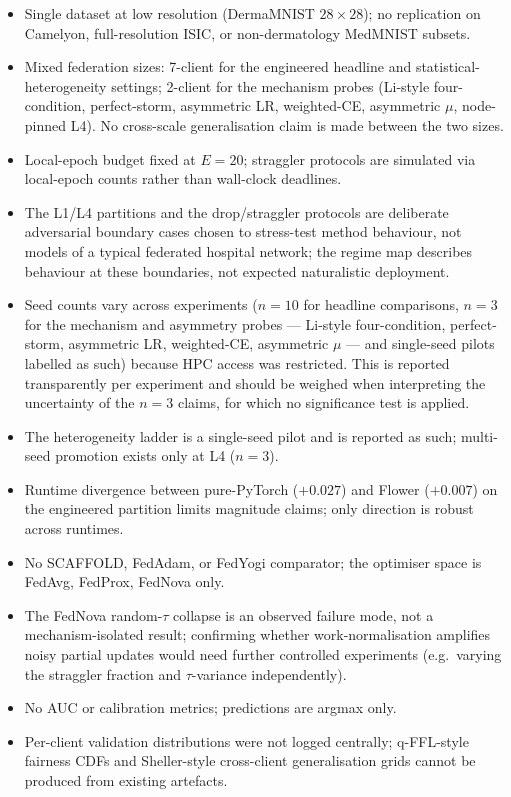 \documentclass[11pt,a4paper]{report}
\begin{document}
\begin{itemize}
\setlength\itemsep{0.15em}
\item Single dataset at low resolution (DermaMNIST $28 \times 28$); no
replication on Camelyon, full-resolution ISIC, or non-dermatology MedMNIST
subsets.
\item Mixed federation sizes: 7-client for the engineered headline and
statistical-heterogeneity settings; 2-client for the mechanism probes
(Li-style four-condition, perfect-storm, asymmetric LR, weighted-CE,
asymmetric $\mu$, node-pinned L4). No cross-scale generalisation claim is
made between the two sizes.
\item Local-epoch budget fixed at $E = 20$; straggler protocols are
simulated via local-epoch counts rather than wall-clock deadlines.
\item The L1/L4 partitions and the drop/straggler protocols are deliberate
adversarial boundary cases chosen to stress-test method behaviour, not models of a
typical federated hospital network; the regime map describes behaviour at these
boundaries, not expected naturalistic deployment.
\item Seed counts vary across experiments ($n = 10$ for headline comparisons,
$n = 3$ for the mechanism and asymmetry probes --- Li-style four-condition,
perfect-storm, asymmetric LR, weighted-CE, asymmetric $\mu$ --- and single-seed
pilots labelled as such) because HPC access was restricted. This is reported
transparently per experiment and should be weighed when interpreting the
uncertainty of the $n = 3$ claims, for which no significance test is applied.
\item The heterogeneity ladder is a single-seed pilot and is reported as
such; multi-seed promotion exists only at L4 ($n = 3$).
\item Runtime divergence between pure-PyTorch ($+0.027$) and Flower
($+0.007$) on the engineered partition limits magnitude claims; only
direction is robust across runtimes.
\item No SCAFFOLD, FedAdam, or FedYogi comparator; the optimiser space is
FedAvg, FedProx, FedNova only.
\item The FedNova random-$\tau$ collapse is an observed failure mode, not a
mechanism-isolated result; confirming whether work-normalisation amplifies noisy
partial updates would need further controlled experiments (e.g.\ varying the
straggler fraction and $\tau$-variance independently).
\item No AUC or calibration metrics; predictions are argmax only.
\item Per-client validation distributions were not logged centrally;
q-FFL-style fairness CDFs and Sheller-style cross-client generalisation
grids cannot be produced from existing artefacts.
\end{itemize}
\end{document}
